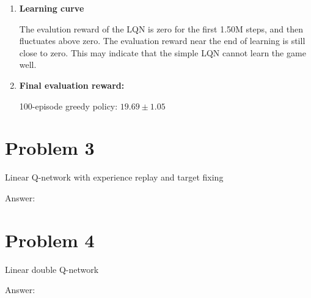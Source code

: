 \documentclass[12pt]{article}
\begin{document}
\begin{tcolorbox}
\begin{center}
\begin{enumerate}
\item {\bf Learning curve}


The evalution reward of the LQN is zero for the first 1.50M steps, and then fluctuates above zero. The evaluation reward near the end of learning is still close to zero. This may indicate that the simple LQN cannot learn the game well. 

\item {\bf Final evaluation reward:}

100-episode greedy policy: $19.69 \pm 1.05$

	
	\end{enumerate}
	\end{center}	
\end{tcolorbox}

\section*{Problem 3}
Linear Q-network with experience replay and target fixing
\begin{tcolorbox}	
	Answer:	
	\begin{center}

	\end{center}	
\end{tcolorbox}

\section*{Problem 4}
Linear double Q-network 
\begin{tcolorbox}	
	Answer:	
	\begin{center}
	
	\end{center}	
\end{tcolorbox}
\end{document}

